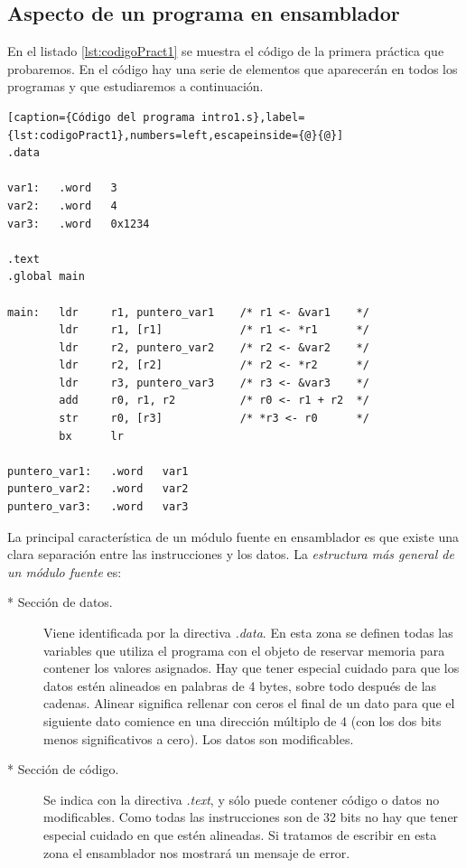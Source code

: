 \subsection{Aspecto de un programa en ensamblador}

En el listado \ref{lst:codigoPract1} se muestra el código de la primera
práctica que probaremos. En el código hay una serie de elementos que
aparecerán en todos los programas y que estudiaremos a continuación.

\begin{lstlisting}[caption={Código del programa intro1.s},label={lst:codigoPract1},numbers=left,escapeinside={@}{@}]
.data

var1:   .word   3
var2:   .word   4
var3:   .word   0x1234

.text
.global main
 
main:   ldr     r1, puntero_var1    /* r1 <- &var1    */
        ldr     r1, [r1]            /* r1 <- *r1      */
        ldr     r2, puntero_var2    /* r2 <- &var2    */
        ldr     r2, [r2]            /* r2 <- *r2      */
        ldr     r3, puntero_var3    /* r3 <- &var3    */
        add     r0, r1, r2          /* r0 <- r1 + r2  */
        str     r0, [r3]            /* *r3 <- r0      */
        bx      lr

puntero_var1:   .word   var1
puntero_var2:   .word   var2
puntero_var3:   .word   var3
\end{lstlisting}

La principal característica de un módulo fuente en ensamblador es
que existe una clara separación entre las instrucciones y los
datos. La {\it estructura más general de un módulo fuente} es:

\begin{description}
     \item[* Sección de datos.] Viene identificada por la directiva {\it .data}.
En esta zona se definen todas las variables que utiliza el programa
con el objeto de reservar memoria para contener los valores asignados. Hay que
tener especial cuidado para que los datos estén alineados en palabras de 4 bytes,
sobre todo después de las cadenas. Alinear significa rellenar con ceros el final
de un dato para que el siguiente dato comience en una dirección múltiplo de 4 (con
los dos bits menos significativos a cero). Los datos son modificables.

     \item[* Sección de código.] Se indica con la directiva {\it .text}, y sólo
puede contener código o datos no modificables. Como todas las instrucciones son
de 32 bits no hay que tener especial cuidado en que estén alineadas. Si tratamos
de escribir en esta zona el ensamblador nos mostrará un mensaje de error.
\end{description}


